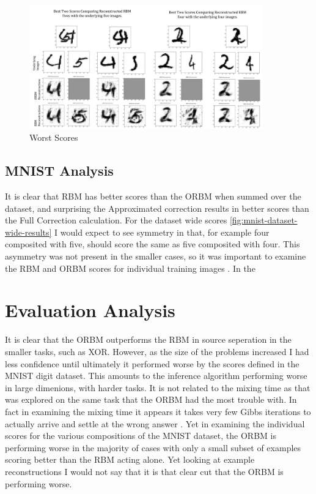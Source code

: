 \begin{figure}[htb]
  \begin{center}
    \includegraphics[width=0.9\textwidth]{Assets/results/orbm-Worst-2-results.png}
  \end{center}
  \caption{Worst Scores}
  \label{F:Worst-Results-MNIST}
\end{figure}


\subsection{MNIST Analysis}

It is clear that RBM has better scores than the ORBM when summed over the dataset, and surprising the Approximated correction results in better scores than the Full Correction calculation. For the dataset wide scores \ref{fig:mnist-dataset-wide-results} I would expect to see symmetry in that, for example four composited with five, should score the same as five composited with four.
This asymmetry was not present in the smaller cases, so it was important to examine the RBM and ORBM scores for individual training images \todocite{\ref{}}. In the


\section{Evaluation Analysis}

It is clear that the ORBM outperforms the RBM in source seperation in the smaller tasks, such as XOR. However, as the size of the problems increased I had less confidence until ultimately it performed worse by the scores defined in the MNIST digit dataset. This amounts to the inference algorithm performing worse in large dimenions, with harder tasks. It is not related to the mixing time as that was explored on the same task that the ORBM had the most trouble with. In fact in examining the mixing time it appears it takes very few Gibbs iterations to actually arrive and settle at the wrong answer \todocite{\ref{}}.
Yet in examining \todocite{\ref{}} the individual scores for the various compositions of the MNIST dataset, the ORBM is performing worse in the majority of cases with only a small subset of examples scoring better than the RBM acting alone. Yet looking at example reconstructions  I would not say that it is that clear cut that the ORBM is performing worse.

